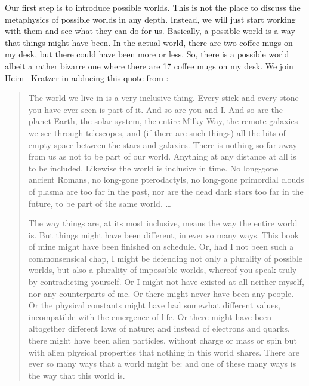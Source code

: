 Our first step is to introduce possible worlds. This is not the place to discuss
the metaphysics of possible worlds in any depth. Instead, we will just start
working with them and see what they can do for us. Basically, a possible world
is a way that things might have been. In the actual world, there are two coffee
mugs on my desk, but there could have been more or less. So, there is a possible
world \dash albeit a rather bizarre one \dash where there are 17 coffee mugs on
my desk. We join Heim \amp\ Kratzer in adducing this quote from
\citet[1f.]{lewis:plurality:1986}:

\begin{quote}
  The world we live in is a very inclusive thing. Every stick and every stone
  you have ever seen is part of it. And so are you and I. And so are the planet
  Earth, the solar system, the entire Milky Way, the remote galaxies we see
  through telescopes, and (if there are such things) all the bits of empty space
  between the stars and galaxies. There is nothing so far away from us as not to
  be part of our world. Anything at any distance at all is to be included.
  Likewise the world is inclusive in time. No long-gone ancient Romans, no
  long-gone pterodactyls, no long-gone primordial clouds of plasma are too far
  in the past, nor are the dead dark stars too far in the future, to be part of
  the same world. \dots
	
  \medskip
	
  The way things are, at its most inclusive, means the way the entire world is.
  But things might have been different, in ever so many ways. This book of mine
  might have been finished on schedule. Or, had I not been such a commonsensical
  chap, I might be defending not only a plurality of possible worlds, but also a
  plurality of impossible worlds, whereof you speak truly by contradicting
  yourself. Or I might not have existed at all \dash neither myself, nor any
  counterparts of me. Or there might never have been any people. Or the physical
  constants might have had somewhat different values, incompatible with the
  emergence of life. Or there might have been altogether different laws of
  nature; and instead of electrons and quarks, there might have been alien
  particles, without charge or mass or spin but with alien physical properties
  that nothing in this world shares. There are ever so many ways that a world
  might be: and one of these many ways is the way that this world is.
\end{quote}

